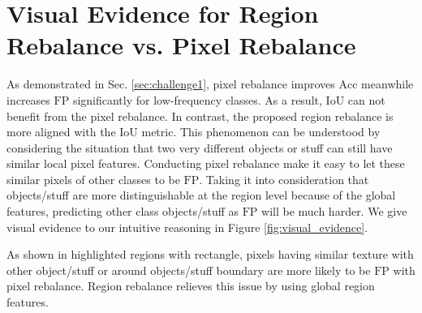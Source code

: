 \documentclass[final]{cvpr}
\begin{document}
\vspace{0.5in}
\section{Visual Evidence for Region Rebalance vs. Pixel Rebalance}
\noindent As demonstrated in Sec. \ref{sec:challenge1}, pixel rebalance improves $\mathrm{Acc}$ meanwhile increases $\mathrm{FP}$ significantly for low-frequency classes. As a result, $\mathrm{IoU}$ can not benefit from the pixel rebalance. In contrast, the proposed region rebalance is more aligned with the $\mathrm{IoU}$ metric. 
This phenomenon can be understood by considering the situation that two very different objects or stuff can still have similar local pixel features. Conducting pixel rebalance make it easy to let these similar pixels of other classes to be $\mathrm{FP}$. Taking it into consideration that objects/stuff are more distinguishable at the region level because of the global features, predicting other class objects/stuff as $\mathrm{FP}$ will be much harder. We give visual evidence to our intuitive reasoning in Figure \ref{fig:visual_evidence}.  


\noindent As shown in highlighted regions with rectangle, pixels having similar texture with other object/stuff or around objects/stuff boundary are more likely to be $\mathrm{FP}$ with pixel rebalance. Region rebalance relieves this issue by using global region features.
\end{document}
